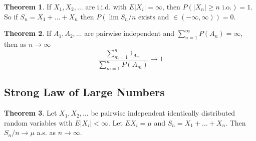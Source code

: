 \documentclass{article}
\theoremstyle{definition}
\newtheorem{theorem}{Theorem}[section]
\begin{document}
\begin{theorem}
    If $X_1, X_2, \dots$ are i.i.d. with $E|X_i| = \infty$, then $P(|X_n| \geq n \text{ i.o.}) = 1$. So if $S_n = X_1 + \dots + X_n$ then $P(\lim S_n/n \text{ exists and } \in (-\infty, \infty)) = 0$.
\end{theorem}

\begin{theorem}
    If $A_1, A_2, \dots$ are pairwise independent and $\sum_{n=1}^\infty P(A_n) = \infty$, then as $n \to \infty$
    $$ \dfrac{\sum\limits_{m=1}^n 1_{A_m}}{\sum\limits_{m=1}^n P(A_m)} \to 1$$
\end{theorem}

\subsection{Strong Law of Large Numbers}

\begin{theorem}
    Let $X_1, X_2, \dots$ be pairwise independent identically distributed random variables with $E|X_i| < \infty$. Let $EX_i = \mu$ and $S_n = X_1 + \dots + X_n$. Then $S_n/n \to \mu$ a.s. as $n \to \infty$.
\end{theorem}
\end{document}
